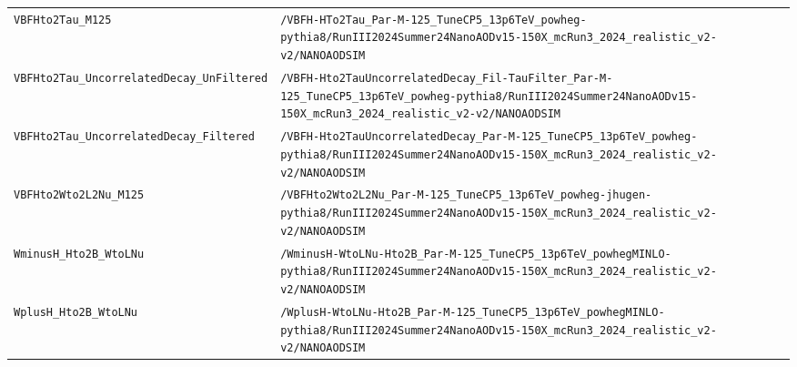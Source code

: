 \begin{longtable}{@{}>{\RaggedRight\arraybackslash}p{} >{\RaggedRight\arraybackslash}p{}@{}}
\addlinespace[2pt]
\texttt{VBFHto2Tau\_\allowbreak{}M125} & \texttt{/\allowbreak{}VBFH-\allowbreak{}HTo2Tau\_\allowbreak{}Par-\allowbreak{}M-\allowbreak{}125\_\allowbreak{}TuneCP5\_\allowbreak{}13p6TeV\_\allowbreak{}powheg-\allowbreak{}pythia8/\allowbreak{}RunIII2024Summer24NanoAODv15-\allowbreak{}150X\_\allowbreak{}mcRun3\_\allowbreak{}2024\_\allowbreak{}realistic\_\allowbreak{}v2-\allowbreak{}v2/\allowbreak{}NANOAODSIM} \\
\addlinespace[2pt]
\texttt{VBFHto2Tau\_\allowbreak{}UncorrelatedDecay\_\allowbreak{}UnFiltered} & \texttt{/\allowbreak{}VBFH-\allowbreak{}Hto2TauUncorrelatedDecay\_\allowbreak{}Fil-\allowbreak{}TauFilter\_\allowbreak{}Par-\allowbreak{}M-\allowbreak{}125\_\allowbreak{}TuneCP5\_\allowbreak{}13p6TeV\_\allowbreak{}powheg-\allowbreak{}pythia8/\allowbreak{}RunIII2024Summer24NanoAODv15-\allowbreak{}150X\_\allowbreak{}mcRun3\_\allowbreak{}2024\_\allowbreak{}realistic\_\allowbreak{}v2-\allowbreak{}v2/\allowbreak{}NANOAODSIM} \\
\addlinespace[2pt]
\texttt{VBFHto2Tau\_\allowbreak{}UncorrelatedDecay\_\allowbreak{}Filtered} & \texttt{/\allowbreak{}VBFH-\allowbreak{}Hto2TauUncorrelatedDecay\_\allowbreak{}Par-\allowbreak{}M-\allowbreak{}125\_\allowbreak{}TuneCP5\_\allowbreak{}13p6TeV\_\allowbreak{}powheg-\allowbreak{}pythia8/\allowbreak{}RunIII2024Summer24NanoAODv15-\allowbreak{}150X\_\allowbreak{}mcRun3\_\allowbreak{}2024\_\allowbreak{}realistic\_\allowbreak{}v2-\allowbreak{}v2/\allowbreak{}NANOAODSIM} \\
\addlinespace[2pt]
\texttt{VBFHto2Wto2L2Nu\_\allowbreak{}M125} & \texttt{/\allowbreak{}VBFHto2Wto2L2Nu\_\allowbreak{}Par-\allowbreak{}M-\allowbreak{}125\_\allowbreak{}TuneCP5\_\allowbreak{}13p6TeV\_\allowbreak{}powheg-\allowbreak{}jhugen-\allowbreak{}pythia8/\allowbreak{}RunIII2024Summer24NanoAODv15-\allowbreak{}150X\_\allowbreak{}mcRun3\_\allowbreak{}2024\_\allowbreak{}realistic\_\allowbreak{}v2-\allowbreak{}v2/\allowbreak{}NANOAODSIM} \\
\addlinespace[2pt]
\texttt{WminusH\_\allowbreak{}Hto2B\_\allowbreak{}WtoLNu} & \texttt{/\allowbreak{}WminusH-\allowbreak{}WtoLNu-\allowbreak{}Hto2B\_\allowbreak{}Par-\allowbreak{}M-\allowbreak{}125\_\allowbreak{}TuneCP5\_\allowbreak{}13p6TeV\_\allowbreak{}powhegMINLO-\allowbreak{}pythia8/\allowbreak{}RunIII2024Summer24NanoAODv15-\allowbreak{}150X\_\allowbreak{}mcRun3\_\allowbreak{}2024\_\allowbreak{}realistic\_\allowbreak{}v2-\allowbreak{}v2/\allowbreak{}NANOAODSIM} \\
\addlinespace[2pt]
\texttt{WplusH\_\allowbreak{}Hto2B\_\allowbreak{}WtoLNu} & \texttt{/\allowbreak{}WplusH-\allowbreak{}WtoLNu-\allowbreak{}Hto2B\_\allowbreak{}Par-\allowbreak{}M-\allowbreak{}125\_\allowbreak{}TuneCP5\_\allowbreak{}13p6TeV\_\allowbreak{}powhegMINLO-\allowbreak{}pythia8/\allowbreak{}RunIII2024Summer24NanoAODv15-\allowbreak{}150X\_\allowbreak{}mcRun3\_\allowbreak{}2024\_\allowbreak{}realistic\_\allowbreak{}v2-\allowbreak{}v2/\allowbreak{}NANOAODSIM} \\

\end{longtable}

